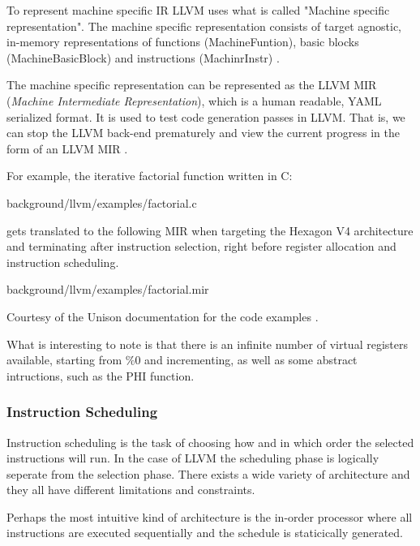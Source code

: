 To represent machine specific IR LLVM uses what is called "Machine specific representation".
The machine specific representation consists of target agnostic, in-memory representations
of functions (MachineFuntion), basic blocks (MachineBasicBlock) and instructions
(MachinrInstr) \cite{llvm-mir-lang-ref, llvm-codegenerator-machinecode}.

The machine specific representation can be represented as the LLVM MIR (\textit{Machine
Intermediate Representation}), which is a human readable, YAML serialized format. It is
used to test code generation passes in LLVM. That is, we can stop the LLVM back-end
prematurely and view the current progress in the form of an LLVM MIR
\cite{llvm-mir-lang-ref}.

For example, the iterative factorial function written in C:


{background/llvm/examples/factorial.c}

gets translated to the following MIR when targeting the Hexagon V4 architecture and
terminating after instruction selection, right before register allocation and instruction
scheduling.


{background/llvm/examples/factorial.mir}

Courtesy of the Unison documentation for the code examples \cite{unison-docs-examples}.

What is interesting to note is that there is an infinite number of virtual registers available,
starting from \%0 and incrementing, as well as some abstract intructions, such as the PHI
function.

\subsubsection{Instruction Scheduling}
Instruction scheduling is the task of choosing how and in which order the selected instructions
will run. In the case of LLVM the scheduling phase is logically seperate from the selection
phase. There exists a wide variety of architecture and they all have different limitations
and constraints.

Perhaps the most intuitive kind of architecture is the in-order processor where all
instructions are executed sequentially and the schedule is staticically generated.

